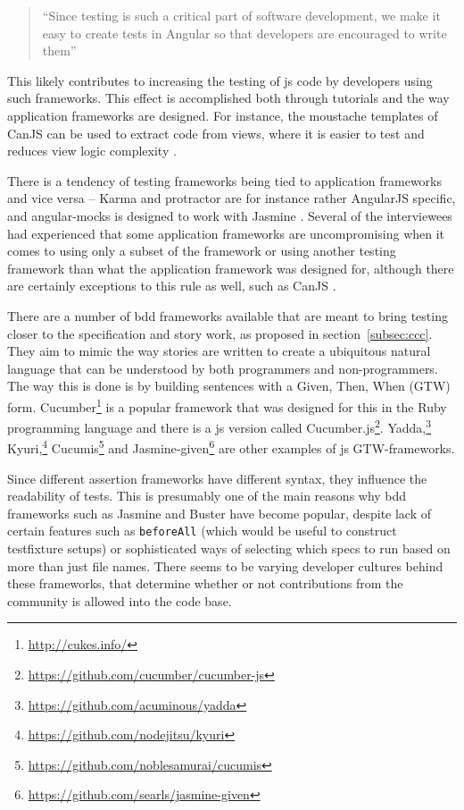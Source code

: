 \documentclass[11pt]{article}
\begin{document}
\begin{quote}
``Since testing is such a critical part of software development, we make it easy to create tests in Angular so that developers are encouraged to write them'' \cite{AngularTemplates}
\end{quote}

This likely contributes to increasing the testing of \gls{js} code by developers using such frameworks. This effect is accomplished both through tutorials and the way application frameworks are designed. For instance, the moustache templates of CanJS can be used to extract code from views, where it is easier to test and reduces view logic complexity \cite[question~32]{Ahnve}.

There is a tendency of testing frameworks being tied to application frameworks and vice versa -- Karma and protractor are for instance rather AngularJS specific, and angular-mocks is designed to work with Jasmine \cite[question~7]{Rovegard}. Several of the interviewees had experienced that some application frameworks are uncompromising when it comes to using only a subset of the framework or using another testing framework than what the application framework was designed for, although there are certainly exceptions to this rule as well, such as CanJS \cite[question~22]{Ahnve}\cite[question~41]{Rovegard}.

There are a number of \gls{bdd} frameworks available that are meant to bring testing closer to the specification and story work, as proposed in section~\ref{subsec:ccc}. They aim to mimic the way stories are written to create a ubiquitous natural language that can be understood by both programmers and non-programmers. The way this is done is by building sentences with a Given, Then, When (GTW) form. Cucumber\footnote{\url{http://cukes.info/}} is a popular framework that was designed for this in the Ruby programming language and there is a \gls{js} version called Cucumber.js\footnote{\url{https://github.com/cucumber/cucumber-js}}.
Yadda,\footnote{\url{https://github.com/acuminous/yadda}}
Kyuri,\footnote{\url{https://github.com/nodejitsu/kyuri}}
Cucumis\footnote{\url{https://github.com/noblesamurai/cucumis}} and
Jasmine-given\footnote{\url{https://github.com/searls/jasmine-given}}
are other examples of \gls{js} GTW-frameworks. \cite[section 8.4]{BDDJS}

Since different assertion frameworks have different syntax, they influence the readability of tests. This is presumably one of the main reasons why \gls{bdd} frameworks such as Jasmine and Buster have become popular, despite lack of certain features such as \texttt{beforeAll} (which would be useful to construct \gls{testfixture} setups) or sophisticated ways of selecting which specs to run based on more than just file names. There seems to be varying developer cultures behind these frameworks, that determine whether or not contributions from the community is allowed into the code base. \cite[question~7]{Ahnve}\cite[question~5-6]{Rovegard}
\end{document}
